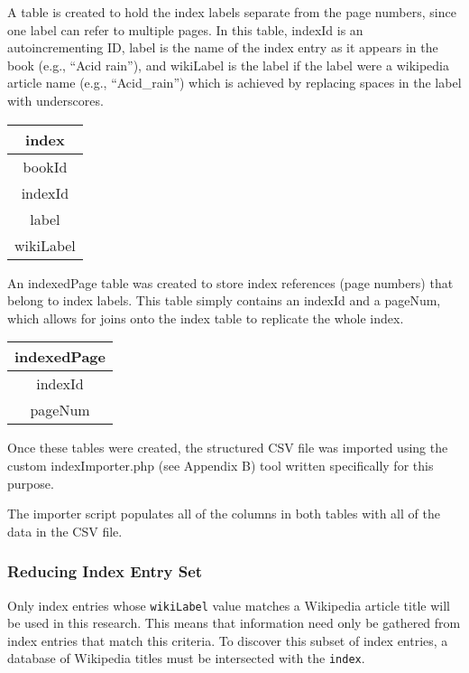 A table is created to hold the index labels separate from the page numbers, since one label can refer to multiple pages.
In this table, indexId is an autoincrementing ID, label is the name of the index entry as it appears in the book (e.g., ``Acid rain''), and wikiLabel is the label if the label were a wikipedia article name (e.g., ``Acid\_rain'') which is achieved by replacing spaces in the label with underscores.

\begin{center}
\begin{tabular}{|c|}
\hline 
\textbf{index} \\ 
\hline 
bookId \\ 
\hline 
indexId \\ 
\hline 
label \\ 
\hline 
wikiLabel \\ 
\hline 
\end{tabular}
\end{center}
 
An indexedPage table was created to store index references (page numbers) that belong to index labels.
This table simply contains an indexId and a pageNum, which allows for joins onto the index table to replicate the whole index.

\begin{center}
\begin{tabular}{|c|}
\hline 
\textbf{indexedPage} \\ 
\hline 
indexId \\ 
\hline 
pageNum \\ 
\hline 
\end{tabular} 
\end{center}

Once these tables were created, the structured CSV file was imported using the custom indexImporter.php (see Appendix B) tool written specifically for this purpose.

The importer script populates all of the columns in both tables with all of the data in the CSV file.

\subsubsection{Reducing Index Entry Set}
\label{subsec:reducing}

Only index entries whose {\tt wikiLabel} value matches a Wikipedia article title will be used in this research.
This means that information need only be gathered from index entries that match this criteria.
To discover this subset of index entries, a database of Wikipedia titles must be intersected with the {\tt index}.

